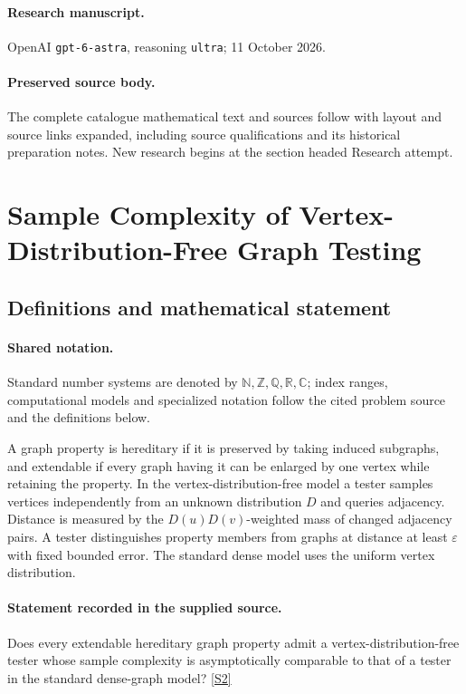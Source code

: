 \documentclass[11pt]{article}
\begin{document}
\paragraph{Research manuscript.} OpenAI \texttt{gpt-6-astra}, reasoning \texttt{ultra}; 11 October 2026.
\paragraph{Preserved source body.} The complete catalogue mathematical text and sources follow with layout and source links expanded, including source qualifications and its historical preparation notes. New research begins at the section headed Research attempt.

\section{Sample Complexity of Vertex-Distribution-Free Graph Testing}\label{statement}

\subsection{Definitions and mathematical statement}

\paragraph{Shared notation.}Standard number systems are denoted by $\mathbb N,\mathbb Z,\mathbb Q,\mathbb R,\mathbb C$; index ranges, computational models and specialized notation follow the cited problem source and the definitions below.


A graph property is hereditary if it is preserved by taking induced subgraphs, and extendable if every graph having it can be enlarged by one vertex while retaining the property. In the vertex-distribution-free model a tester samples vertices independently from an unknown distribution $D$ and queries adjacency. Distance is measured by the $D(u)D(v)$-weighted mass of changed adjacency pairs. A tester distinguishes property members from graphs at distance at least $\varepsilon$ with fixed bounded error. The standard dense model uses the uniform vertex distribution.
\paragraph{Statement recorded in the supplied source.}
Does every extendable hereditary graph property admit a vertex-distribution-free tester whose sample complexity is asymptotically comparable to that of a tester in the standard dense-graph model? \href{https://doi.org/10.4171/owr/2019/19}{[S2]}
\end{document}
